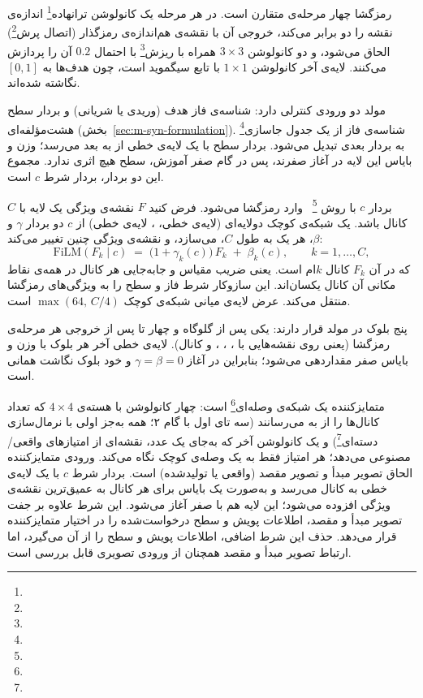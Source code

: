 رمزگشا چهار مرحله‌ی متقارن است. در هر مرحله یک کانولوشن ترانهاده\footnote{} اندازه‌ی نقشه را دو برابر می‌کند، خروجی آن با نقشه‌ی هم‌اندازه‌ی رمزگذار (اتصال پرش\footnote{}) الحاق می‌شود، و دو کانولوشن $3\times3$ همراه با ریزش\footnote{} با احتمال $0.2$ آن را پردازش می‌کنند. لایه‌ی آخر کانولوشن $1\times1$ با تابع سیگموید است، چون هدف‌ها به $[0,1]$ نگاشته شده‌اند.

مولد دو ورودی کنترلی دارد: شناسه‌ی فاز هدف (وریدی یا شریانی) و بردار سطح هشت‌مؤلفه‌ای (بخش~\ref{sec:m-syn-formulation}). شناسه‌ی فاز از یک جدول جاسازی\footnote{} به بردار بعدی تبدیل می‌شود. بردار سطح با یک لایه‌ی خطی از  به  بعد می‌رسد؛ وزن و بایاس این لایه در آغاز صفرند، پس در گام صفر آموزش، سطح هیچ اثری ندارد. مجموع این دو بردار، بردار شرط $c$ است.

بردار $c$ با روش \footnote{}~\cite{perez2018film} وارد رمزگشا می‌شود. فرض کنید $F$ نقشه‌ی ویژگی یک لایه با $C$ کانال باشد. یک شبکه‌ی کوچک دولایه‌ای (لایه‌ی خطی، ، لایه‌ی خطی) از $c$ دو بردار $\gamma$ و $\beta$، هر یک به طول $C$، می‌سازد، و نقشه‌ی ویژگی چنین تغییر می‌کند:
\[
\mathrm{FiLM}(F_k \mid c) \;=\; \bigl(1+\gamma_k(c)\bigr)\,F_k \;+\; \beta_k(c), \qquad k = 1,\dots,C ,
\]
که در آن $F_k$ کانال $k$ام است. یعنی ضریب مقیاس و جابه‌جایی هر کانال در همه‌ی نقاط مکانی آن کانال یکسان‌اند. این سازوکار شرط فاز و سطح را به ویژگی‌های رمزگشا منتقل می‌کند. عرض لایه‌ی میانی شبکه‌ی کوچک $\max(64,\,C/4)$ است.

پنج بلوک  در مولد قرار دارند: یکی پس از گلوگاه و چهار تا پس از خروجی هر مرحله‌ی رمزگشا (یعنی روی نقشه‌هایی با ، ، ،  و  کانال). لایه‌ی خطی آخر هر بلوک با وزن و بایاس صفر مقداردهی می‌شود؛ بنابراین در آغاز $\gamma=\beta=0$ و خود بلوک  نگاشت همانی است.

متمایزکننده یک شبکه‌ی وصله‌ای\footnote{} است: چهار کانولوشن با هسته‌ی $4\times4$ که تعداد کانال‌ها را از  به  می‌رسانند (سه تای اول با گام ۲؛ همه به‌جز اولی با نرمال‌سازی دسته‌ای\footnote{}) و یک کانولوشن آخر که به‌جای یک عدد، نقشه‌ای از امتیازهای واقعی/مصنوعی می‌دهد؛ هر امتیاز فقط به یک وصله‌ی کوچک نگاه می‌کند. ورودی متمایزکننده الحاق تصویر مبدأ و تصویر مقصد (واقعی یا تولیدشده) است. بردار شرط $c$ با یک لایه‌ی خطی به  کانال می‌رسد و به‌صورت یک بایاس برای هر کانال به عمیق‌ترین نقشه‌ی ویژگی افزوده می‌شود؛ این لایه هم با صفر آغاز می‌شود. این شرط علاوه بر جفت تصویر مبدأ و مقصد، اطلاعات پویش و سطح درخواست‌شده را در اختیار متمایزکننده قرار می‌دهد. حذف این شرط اضافی، اطلاعات پویش و سطح را از آن می‌گیرد، اما ارتباط تصویر مبدأ و مقصد همچنان از ورودی تصویری قابل بررسی است.

